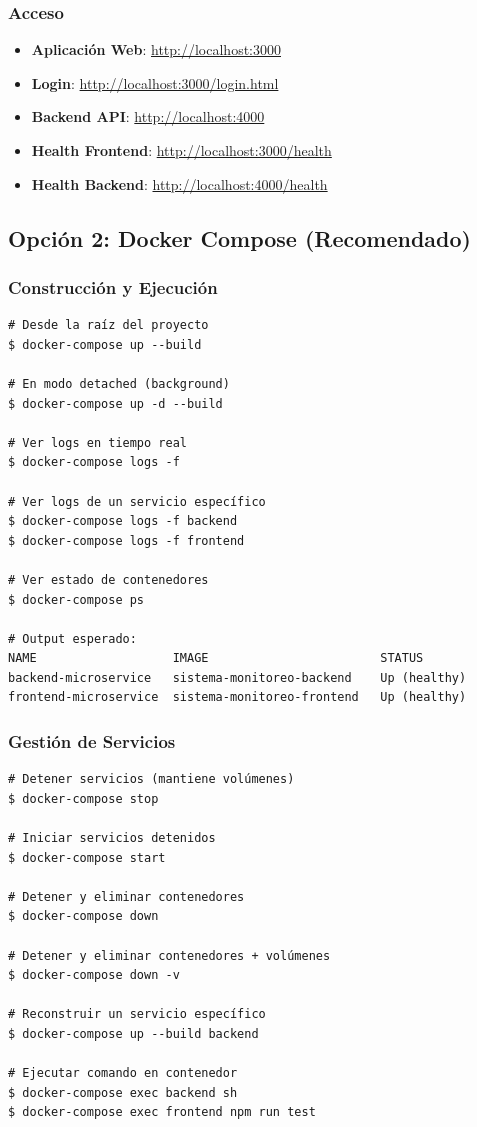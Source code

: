 \documentclass[12pt,a4paper]{article}
\begin{document}
\subsubsection{Acceso}

\begin{itemize}
    \item \textbf{Aplicación Web}: \url{http://localhost:3000}
    \item \textbf{Login}: \url{http://localhost:3000/login.html}
    \item \textbf{Backend API}: \url{http://localhost:4000}
    \item \textbf{Health Frontend}: \url{http://localhost:3000/health}
    \item \textbf{Health Backend}: \url{http://localhost:4000/health}
\end{itemize}

\subsection{Opción 2: Docker Compose (Recomendado)}

\subsubsection{Construcción y Ejecución}

\begin{verbatim}
# Desde la raíz del proyecto
$ docker-compose up --build

# En modo detached (background)
$ docker-compose up -d --build

# Ver logs en tiempo real
$ docker-compose logs -f

# Ver logs de un servicio específico
$ docker-compose logs -f backend
$ docker-compose logs -f frontend

# Ver estado de contenedores
$ docker-compose ps

# Output esperado:
NAME                   IMAGE                        STATUS
backend-microservice   sistema-monitoreo-backend    Up (healthy)
frontend-microservice  sistema-monitoreo-frontend   Up (healthy)
\end{verbatim}

\subsubsection{Gestión de Servicios}

\begin{verbatim}
# Detener servicios (mantiene volúmenes)
$ docker-compose stop

# Iniciar servicios detenidos
$ docker-compose start

# Detener y eliminar contenedores
$ docker-compose down

# Detener y eliminar contenedores + volúmenes
$ docker-compose down -v

# Reconstruir un servicio específico
$ docker-compose up --build backend

# Ejecutar comando en contenedor
$ docker-compose exec backend sh
$ docker-compose exec frontend npm run test
\end{verbatim}
\end{document}
